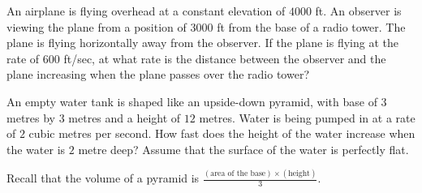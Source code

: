 \documentclass[../main.tex]{subfiles}
\begin{document}
  \clearpage
  \begin{example}
    An airplane is flying overhead at a constant elevation of \(4000\) ft. An observer is viewing the plane from a position of \(3000\) ft from the base of a radio tower. The plane is flying horizontally away from the observer. If the plane is flying at the rate of \(600\) ft/sec, at what rate is the distance between the observer and the plane increasing when the plane passes over the radio tower?

  \end{example}
  \clearpage

  \begin{example}
    An empty water tank is shaped like an upside-down pyramid, with base of \(3\) metres by \(3\) metres and a height of \(12\) metres. Water is being pumped in at a rate of \(2\) cubic metres per second. How fast does the height of the water increase when the water is \(2\) metre deep? Assume that the surface of the water is perfectly flat. 

    Recall that the volume of a pyramid is \(\frac{(\text{area of the base}) \times (\text{height})}{3}\).

  \end{example}
\end{document}
